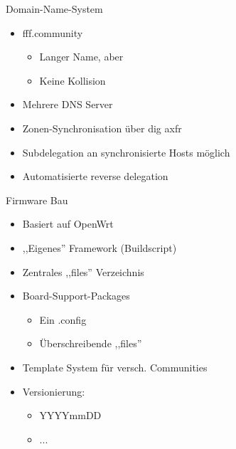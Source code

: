 \begin{frame}{Domain-Name-System}
    \begin{itemize}
        \item fff.community
        \begin{itemize}
            \item Langer Name, aber
            \item Keine Kollision
        \end{itemize}
        \item Mehrere DNS Server
        \item Zonen-Synchronisation über dig axfr
        \item Subdelegation an synchronisierte Hosts möglich
        \item Automatisierte reverse delegation
    \end{itemize}
\end{frame}

\begin{frame}{Firmware Bau}
    \begin{itemize}
        \item Basiert auf OpenWrt
        \item ,,Eigenes'' Framework (Buildscript)
        \item Zentrales ,,files'' Verzeichnis
        \item Board-Support-Packages
        \begin{itemize}
            \item Ein .config
            \item Überschreibende ,,files''
        \end{itemize}
        \item Template System für versch. Communities
        \item Versionierung:
            \begin{itemize}
                \item YYYYmmDD
                \item ...
            \end{itemize}
    \end{itemize}
\end{frame}

